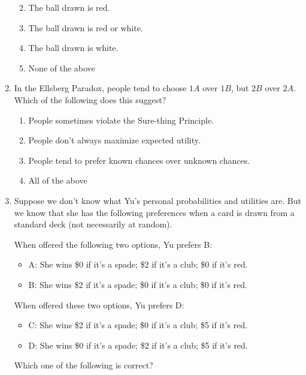 \documentclass[justified]{tufte-book}
\providecommand{\tightlist}{%
  \setlength{\itemsep}{0pt}\setlength{\parskip}{0pt}}
\theoremstyle{definition}
\theoremstyle{definition}
\theoremstyle{definition}
\theoremstyle{definition}
\theoremstyle{remark}
\begin{document}
\begin{enumerate}
  \begin{enumerate}
  \def\labelenumii{\alph{enumii}.}
  \tightlist
  \item
    The ball drawn is red.
  \item
    The ball drawn is red or white.
  \item
    The ball drawn is white.
  \item
    None of the above
  \end{enumerate}
\item
  In the Ellsberg Paradox, people tend to choose \(1A\) over \(1B\), but \(2B\) over \(2A\). Which of the following does this suggest?

  \begin{enumerate}
  \def\labelenumii{\alph{enumii}.}
  \tightlist
  \item
    People sometimes violate the Sure-thing Principle.
  \item
    People don't always maximize expected utility.
  \item
    People tend to prefer known chances over unknown chances.
  \item
    All of the above
  \end{enumerate}
\item
  Suppose we don't know what Yu's personal probabilities and utilities are. But we know that she has the following preferences when a card is drawn from a standard deck (not necessarily at random).

  When offered the following two options, Yu prefers B:

  \begin{itemize}
  \tightlist
  \item
    A: She wins \$0 if it's a spade; \$2 if it's a club; \$0 if it's red.
  \item
    B: She wins \$2 if it's a spade; \$0 if it's a club; \$0 if it's red.
  \end{itemize}

  When offered these two options, Yu prefers D:

  \begin{itemize}
  \tightlist
  \item
    C: She wins \$2 if it's a spade; \$0 if it's a club; \$5 if it's red.
  \item
    D: She wins \$0 if it's a spade; \$2 if it's a club; \$5 if it's red.
  \end{itemize}

  Which one of the following is correct?


\end{enumerate}
\end{document}
